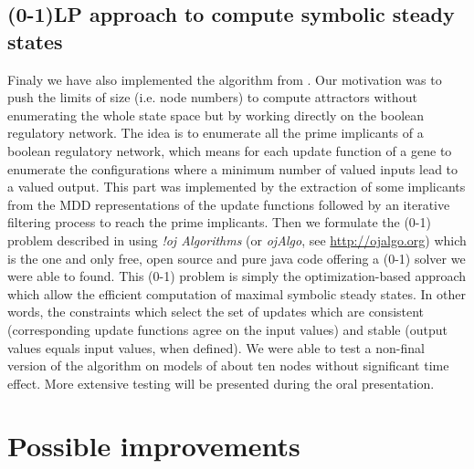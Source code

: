 \documentclass[a4paper,11pt]{article}
\begin{document}
\subsection{(0-1)LP approach to compute symbolic steady states}
Finaly we have also implemented the algorithm from \cite{Klarner}. Our
motivation was to push the limits of size (i.e. node numbers) to compute
attractors without enumerating the whole state space but by working directly on
the boolean regulatory network. The idea is to enumerate all the prime
implicants of a boolean regulatory network, which means for each update function
of a gene to enumerate the configurations where a minimum number of valued
inputs lead to a valued output. This part was implemented by the extraction of
some implicants from the MDD representations of the update functions followed by
an iterative filtering process to reach the prime implicants. Then we formulate
the (0-1) problem described in \cite{Klarner} using \emph{!oj Algorithms}
(or \emph{ojAlgo}, see \href{http://ojalgo.org}{http://ojalgo.org}) which is the
one and only free, open source and pure java code offering a (0-1) solver we
were able to found. This (0-1) problem is simply the optimization-based approach
which allow the efficient computation of maximal symbolic steady states. In other
words, the constraints which select the set of updates which are consistent
(corresponding update functions agree on the input values) and stable (output
values equals input values, when defined). We were able to test a non-final
version of the algorithm on models of about ten nodes without significant time
effect. More extensive testing will be presented during the oral presentation.


\section{Possible improvements}
\end{document}
